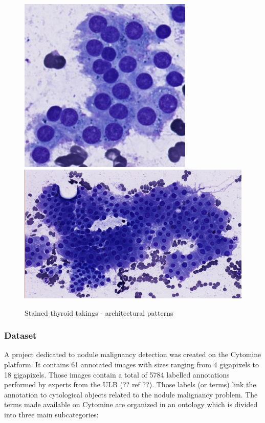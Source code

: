 \begin{figure}
{		\includegraphics[scale=0.5]{image/normal_pattern_1.png}
		\includegraphics[scale=0.5]{image/normal_pattern_2.png}
		\label{sfig:norm_patterns}
	}
	\caption{Stained thyroid takings - architectural patterns}
	\label{fig:intro_pattern_ex}
\end{figure}


\subsubsection{Dataset}
\label{sssec:detection_thyroid_dataset}
A project dedicated to nodule malignancy detection was created on the Cytomine platform. It contains 61 annotated images with sizes ranging from 4 gigapixels to 18 gigapixels. Those images contain a total of 5784 labelled annotations performed by experts from the ULB (?? ref ??). Those labels (or terms) link the annotation to cytological objects related to the nodule malignancy problem. The terms made available on Cytomine are organized in an ontology which is divided into three main subcategories:

